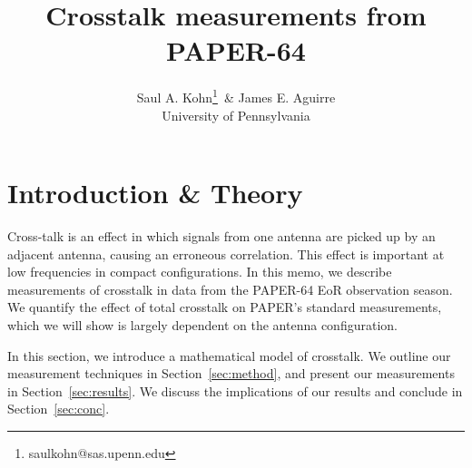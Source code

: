 \documentclass[10pt,a4paper,notitlepage]{article}
\title{Crosstalk measurements from PAPER-64}
\author{Saul A. Kohn\thanks{saulkohn@sas.upenn.edu}\,\,\,\& James E. Aguirre \\
\small{University of Pennsylvania}\\ }
\begin{document}
\maketitle


\section{Introduction \& Theory}
\label{sec:intro}
Cross-talk is an effect in which signals from one antenna are picked up by an adjacent antenna, causing an erroneous correlation. This effect is important at low frequencies in compact configurations.
In this memo, we describe measurements of crosstalk in data from the PAPER-64 EoR observation season. We quantify the effect of total crosstalk on PAPER's standard measurements, which we will show is largely dependent on the antenna configuration.

In this section, we introduce a mathematical model of crosstalk. We outline our measurement techniques in Section~\ref{sec:method}, and present our measurements in Section~\ref{sec:results}. We discuss the implications of our results and conclude in Section~\ref{sec:conc}.
\end{document}
